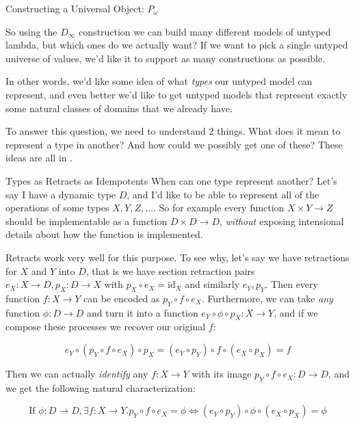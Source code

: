 \documentclass{article}
\newcommand{\dinfty}{D_{\infty}}
\newcommand{\id}{\text{id}}
\begin{document}
\begin{section}{Constructing a Universal Object: $P_{\omega}$}

  So using the $\dinfty$ construction we can build many different
  models of untyped lambda, but which ones do we actually want?  If we
  want to pick a single untyped universe of values, we'd like it to
  support as many constructions as possible.

  In other words, we'd like some idea of what \emph{types} our untyped
  model can represent, and even better we'd like to get untyped models
  that represent exactly some natural classes of domains that we
  already have.

  To answer this question, we need to understand 2 things. What does
  it mean to represent a type in another? And how could we possibly
  get one of these? These ideas are all in \cite{scott1976data}.

  \begin{subsection}{Types as Retracts as Idempotents}
    When can one type represent another? Let's say I have a dynamic
    type $D$, and I'd like to be able to represent all of the
    operations of some types $X,Y,Z,\ldots$.  So for example every
    function $X\times Y \to Z$ should be implementable as a function
    $D\times D \to D$, \emph{without} exposing intensional details
    about how the function is implemented.

    Retracts work very well for this purpose. To see why, let's say we
    have retractions for $X$ and $Y$ into $D$, that is we have section
    retraction pairs $e_X : X \to D, p_X : D \to X$ with
    $p_X \circ e_X = \id_X$ and similarly $e_Y,p_Y$. Then every
    function $f : X\to Y$ can be encoded as $p_Y \circ f \circ
    e_X$. Furthermore, we can take \emph{any} function
    $\phi : D \to D$ and turn it into a function
    $e_Y \circ \phi \circ p_X : X \to Y$, and if we compose these
    processes we recover our original $f$:

    \[
      e_Y \circ (p_Y \circ f \circ e_X) \circ p_X = (e_Y \circ p_Y) \circ f \circ (e_X \circ p_X) = f
    \]

    Then we can actually \emph{identify} any $f : X \to Y$ with its
    image $p_Y \circ f \circ e_X : D \to D$, and we get the following
    natural characterization:

    \[ \text{If } \phi : D \to D, \exists f : X \to Y. p_Y\circ f
      \circ e_X = \phi \iff (e_Y \circ p_Y) \circ \phi \circ (e_X
      \circ p_X) = \phi \]


\end{subsection}
\end{section}
\end{document}
